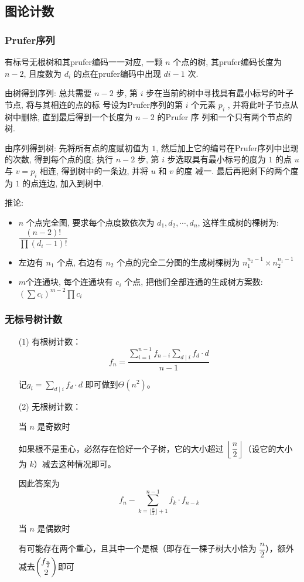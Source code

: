 \documentclass[twoside]{article}
\begin{document}
\subsection{图论计数}
\subsubsection{Prufer序列}
有标号无根树和其prufer编码一一对应, 一颗 $n$ 个点的树, 其prufer编码长度为 $n - 2$, 且度数为 $d_i$ 的点在prufer编码中出现 $di - 1$ 次.

由树得到序列: 总共需要 $n - 2$ 步, 第 $i$ 步在当前的树中寻找具有最小标号的叶子节点, 将与其相连的点的标
号设为Prufer序列的第 $i$ 个元素 $p_i$ , 并将此叶子节点从树中删除, 直到最后得到一个长度为 $n - 2$ 的Prufer 序
列和一个只有两个节点的树.

由序列得到树: 先将所有点的度赋初值为 $1$, 然后加上它的编号在Prufer序列中出现的次数, 得到每个点的度;
执行 $n - 2$ 步, 第 $i$ 步选取具有最小标号的度为 $1$ 的点 $u$ 与 $v = p_i$ 相连, 得到树中的一条边, 并将 $u$ 和 $v$ 的度
减一. 最后再把剩下的两个度为 $1$ 的点连边, 加入到树中.

推论:

\begin{itemize}
    \item $n$ 个点完全图, 要求每个点度数依次为 $d_1, d_2 ,\cdots,d_n$, 这样生成树的棵树为: $\dfrac{(n-2)!}{\prod (d_i-1)!}$
    \item 左边有 $n_1$ 个点, 右边有 $n_2$ 个点的完全二分图的生成树棵树为 $n_1^{n_2-1}\times n_2^{n_1-1}$
    \item $m$个连通块, 每个连通块有 $c_i$ 个点, 把他们全部连通的生成树方案数: $(\sum c_i)^{m-2} \prod c_i$
\end{itemize}

\subsubsection{无标号树计数}
\begin{enumerate}
    \item[(1)]有根树计数： $$f_n = \dfrac{ \sum_{i=1}^{n-1} f_{n-i} \sum_{d \mid i} f_d \cdot d}{n-1}$$
    
    记$g_i = \sum_{d \mid i} f_d \cdot d$ 即可做到$\Theta(n^2)$。
    \item[(2)]无根树计数：
    
    当 $n$ 是奇数时

    如果根不是重心，必然存在恰好一个子树，它的大小超过 $\left\lfloor\dfrac n2\right\rfloor$（设它的大小为 $k$）减去这种情况即可。
    
    因此答案为
    $$f_n-\sum_{k=\lfloor\frac n2\rfloor+1}^{n-1}f_k\cdot f_{n-k}$$
    
    当 $n$ 是偶数时
    
    有可能存在两个重心，且其中一个是根（即存在一棵子树大小恰为 $\dfrac n2$），额外减去$\dbinom{f_{\frac n2}}2$即可
\end{enumerate}
\end{document}
